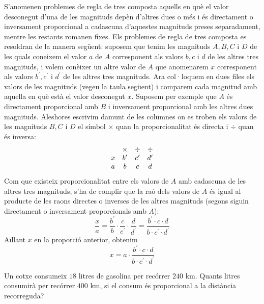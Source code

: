 S'anomenen problemes de regla de tres composta aquells en
què el valor desconegut d'una de les magnituds depèn d'altres dues o
més i és directament o inversament proporcional a cadascuna d'aquestes magnituds preses
separadament, mentre les restants romanen fixes. Els problemes de regla de
tres composta es resoldran de la manera següent: suposem que
tenim les magnituds \(A,B,C\) i \(D\) de les quals coneixem el valor \(a\) de
\(A\) corresponent als valors \(b,c\) i \(d\) de les altres tres magnituds, i
volem conèixer un altre valor de $A$ que anomenarem $x$ corresponent als
valors \(b^{\prime},c^{\prime}\) i \(d^{\prime}\) de les altres tres magnituds.
Ara col·loquem en dues files els valors de les magnituds (vegeu la taula
següent) i comparem cada magnitud amb aquella en què està el valor
desconegut \(x\). Suposem per exemple que \(A\) és directament proporcional
amb \(B\) i inversament proporcional amb les altres dues magnituds. Aleshores
escrivim damunt de les columnes on es troben els valors de les
magnituds \(B,C\) i \(D\) el símbol $\times$ quan la proporcionalitat és
directa i $\div$ quan és inversa:%
\[%
\begin{array}
[c]{cccc}
& \times & \div & \div\\
x & b^{\prime} & c^{\prime} & d^{\prime}\\
a & b & c & d
\end{array}
\]
Com que existeix proporcionalitat entre els valors de $A$ amb cadascuna de
les altres tres magnituds, s’ha de complir que la raó dels valors de
$A$ és igual al producte de les raons directes o inverses de les altres
magnituds (segons siguin directament o inversament proporcionals amb $A$):%
\[
\frac{x}{a}=\frac{b^{\prime}}{b}\cdot\frac{c}{c^{\prime}}\cdot\frac
{d}{d^{\prime}}=\frac{b^{\prime}\cdot c\cdot d}{b\cdot c^{\prime}\cdot
d^{\prime}}%
\]
Aïllant \(x\) en la proporció anterior, obtenim%
\[
x=a\cdot\frac{b^{\prime}\cdot c\cdot d}{b\cdot c^{\prime}\cdot d^{\prime}}%
\]

\begin{exemple}
Un cotxe consumeix \(18\) litres de gasolina per recórrer \(240\) km. Quants litres consumirà per recórrer \(400\) km, si el consum és proporcional a la distància recorreguda?
\end{exemple}

